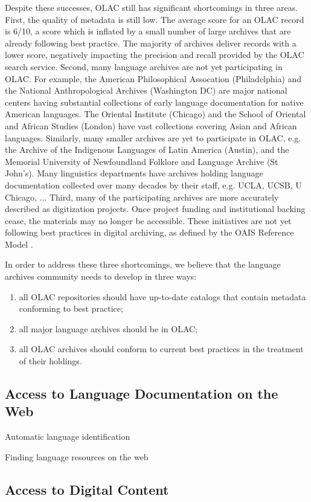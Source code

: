 Despite these successes, OLAC still has significant shortcomings in
three areas.
First, the quality of metadata is still low.  The average score for an
OLAC record is 6/10, a score which is inflated by a small number of
large archives that are already following best practice.  The majority
of archives deliver records with a lower score, negatively impacting
the precision and recall provided by the OLAC search service.
Second, many language archives are not yet participating in OLAC.  For
example, the American Philosophical Assocation (Philadelphia) and the
National Anthropological Archives (Washington DC) are major national
centers having substantial collections of early language documentation
for native American languages.  The Oriental Institute (Chicago) and
the School of Oriental and African Studies (London) have vast
collections covering Asian and African languages.  Similarly, many
smaller archives are yet to participate in OLAC, e.g. the
Archive of the Indigenous Languages of Latin America (Austin), and the
Memorial University of Newfoundland Folklore and Language Archive (St
John's).  Many linguistics departments have archives holding language
documentation collected over many decades by their staff, e.g. UCLA,
UCSB, U Chicago, ...
Third, many of the participating archives are more accurately described
as digitization projects.  Once project funding and institutional
backing cease, the materials may no longer be accessible.  These
initiatives are not yet following best practices in digital archiving,
as defined by the OAIS Reference Model \citep{OAIS02}.


In order to address these three shortcomings, we believe that the
language archives community needs to develop in three ways:

\begin{enumerate}
\item all OLAC repositories should have up-to-date catalogs
      that contain metadata conforming to best practice;
\item all major language archives should be in OLAC;
\item all OLAC archives should conform to current best practices
      in the treatment of their holdings.
\end{enumerate}

\subsection{Access to Language Documentation on the Web}

Automatic language identification
\citep{HughesBaldwin06lrec}

Finding language resources on the web
\citep{BaldwinBird06}

\vspace{1in}

\subsection{Access to Digital Content}

\vspace{1in}

